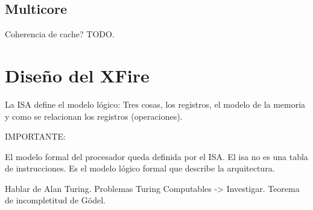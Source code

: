 \subsection{Multicore}
\label{subsec:optimizations-multicore}

Coherencia de cache?
TODO.



\section{Diseño del XFire}

La ISA define el modelo lógico: Tres cosas, los registros, el modelo de la
memoria y como se relacionan los registros (operaciones).



IMPORTANTE:

El modelo formal del procesador queda definida por el ISA. El isa no es una tabla de instrucciones. Es el modelo lógico formal que describe la arquitectura.

Hablar de Alan Turing. Problemas Turing Computables -> Investigar. Teorema de incompletitud de Gödel.
